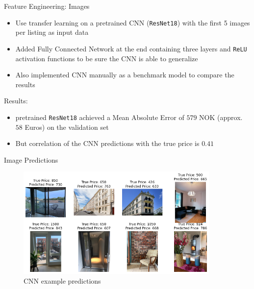 \documentclass[ngerman,inputenc]{beamer}
\begin{document}
\begin{frame}{Feature Engineering: Images}

  \begin{itemize}
    \item Use transfer learning on a pretrained CNN (\texttt{ResNet18}) with the first 5 images per listing as input data
    \item Added Fully Connected Network at the end containing three layers and \texttt{ReLU} activation functions to be sure the CNN is able to generalize
    \item Also implemented CNN manually as a benchmark model to compare the results
  \end{itemize}

  \pause

  \hspace{5pt}
  
  Results:
  \begin{itemize}
    \item pretrained \texttt{ResNet18} achieved a Mean Absolute Error of $579$ NOK (approx. $58$ Euros) on the validation set
    \item But correlation of the CNN predictions with the true price is $0.41$
  \end{itemize}

\end{frame}

\begin{frame}{Image Predictions}

  \begin{figure}[H]
    \centering
    \includegraphics[width=10cm]{cnn_examples_medium.png}
    \caption{CNN example predictions}
  \end{figure}

\end{frame}
\end{document}
